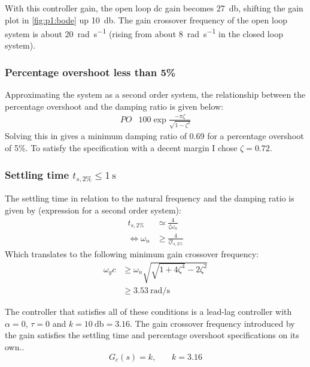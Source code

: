 With this controller gain, the open loop dc gain becomes \SI{27}{\decibel}, shifting the gain plot in \cref{fig:p1:bode} up \SI{10}{\decibel}. The gain crossover frequency of the open loop system is about \SI{20}{\radian\per\second} (rising from about \SI{8}{\radian\per\second} in the closed loop system).

\subsubsection*{Percentage overshoot less than 5\%}
Approximating the system as a second order system, the relationship between the percentage overshoot and the damping ratio is given below:
\begin{align*}
	PO & 100\exp{\frac{-\pi \zeta}{\sqrt{1-\zeta^2}}}
\end{align*}
Solving this in \matlab gives a minimum damping ratio of 0.69 for a percentage overshoot of 5\%. To satisfy the specification with a decent margin I chose $\zeta=0.72$.

\subsubsection*{Settling time $t_{s,2\%}\leq \SI{1}{\second}$}
The settling time in relation to the natural frequency and the damping ratio is given by (expression for a second order system):
\begin{align*}
	t_{s,2\%} &\simeq \frac{4}{\zeta \omega_n}\\
	\iff \omega_n &\geq \frac{4}{\zeta t_{s,2\%}}
\end{align*}
Which translates to the following minimum gain crossover frequency:
\begin{align*}
	\omega_gc &\geq \omega_n \sqrt{\sqrt{1 + 4\zeta^4}-2\zeta^2}\\
	&\geq \SI{3.53}{\radian\per\second} 
\end{align*}

The controller that satisfies all of these conditions is a lead-lag controller with $\alpha=0$, $\tau=0$ and $k=\SI{10}{\decibel}=3.16$. The gain crossover frequency introduced by the gain satisfies the settling time and percentage overshoot specifications on its own..
$$
G_c(s) = k\text{,}\qquad k=3.16
$$